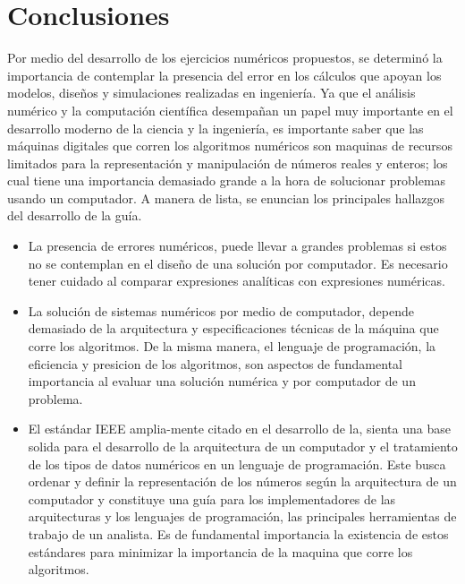 \documentclass[11pt, spanish]{article}
\begin{document}
\section{Conclusiones}

Por medio del desarrollo de los ejercicios numéricos propuestos, se determinó la importancia de contemplar la presencia del error en los cálculos que apoyan los modelos, diseños y simulaciones realizadas en ingeniería. Ya que el análisis numérico y la computación científica desempañan un papel muy importante en el desarrollo moderno de la ciencia y la ingeniería, es importante saber que las máquinas digitales que corren los algoritmos numéricos son maquinas de recursos limitados para la representación y manipulación de números reales y enteros; los cual tiene una importancia demasiado grande a la hora de solucionar problemas usando un computador. A manera de lista, se enuncian los principales hallazgos del desarrollo de la guía.

\begin{itemize}
  \item La presencia de errores numéricos, puede llevar a grandes problemas si estos no se contemplan en el diseño de una solución por computador. Es necesario tener cuidado al comparar expresiones analíticas con expresiones numéricas.
  
  \item La solución de sistemas numéricos por medio de computador, depende demasiado de la arquitectura y especificaciones técnicas de la máquina que corre los algoritmos. De la misma manera, el lenguaje de programación, la eficiencia y presicion de los algoritmos, son aspectos de fundamental importancia al evaluar una solución numérica y por computador de un problema.
  
  \item El estándar IEEE amplia-mente citado en el desarrollo de la, sienta una base solida para el desarrollo de la arquitectura de un computador y el tratamiento de los tipos de datos numéricos en un lenguaje de programación. Este busca ordenar y definir la representación de los números según la arquitectura de un computador y constituye una guía para los implementadores de las arquitecturas y los lenguajes de programación, las principales herramientas de trabajo de un analista. Es de fundamental importancia la existencia de estos estándares para minimizar la importancia de la maquina que corre los algoritmos.
   
\end{itemize}
\end{document}
